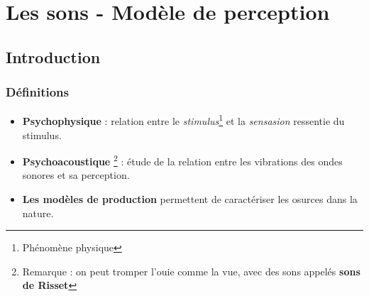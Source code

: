 \chapter{Les sons - Modèle de perception}
\section{Introduction}
\subsection{Définitions}
\begin{itemize}
    \item \textbf{Psychophysique} : relation entre le \textit{stimulus}\footnote{Phénomène physique} et la \textit{sensasion} ressentie du stimulus. \newline
    \item \textbf{Psychoacoustique} \footnote{Remarque : on peut tromper l'ouie comme la vue, avec des sons appelés \textbf{sons de Risset}} : étude de la relation entre les vibrations des ondes sonores et sa perception.\newline
    \item \textbf{Les modèles de production} permettent de caractériser les osurces dans la nature.
\end{itemize}
\newpage
